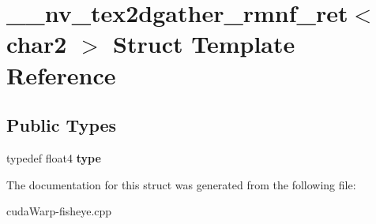 \hypertarget{struct____nv__tex2dgather__rmnf__ret_3_01char2_01_4}{}\section{\+\_\+\+\_\+nv\+\_\+tex2dgather\+\_\+rmnf\+\_\+ret$<$ char2 $>$ Struct Template Reference}
\label{struct____nv__tex2dgather__rmnf__ret_3_01char2_01_4}
\subsection*{Public Types}
\begin{DoxyCompactItemize}
\item 
typedef float4 {\bfseries type}\hypertarget{struct____nv__tex2dgather__rmnf__ret_3_01char2_01_4_abc05c85d7c85c1a3ad973167ff7d6984}{}\label{struct____nv__tex2dgather__rmnf__ret_3_01char2_01_4_abc05c85d7c85c1a3ad973167ff7d6984}

\end{DoxyCompactItemize}


The documentation for this struct was generated from the following file\+:\begin{DoxyCompactItemize}
\item 
cuda\+Warp-\/fisheye.\+cpp\end{DoxyCompactItemize}

